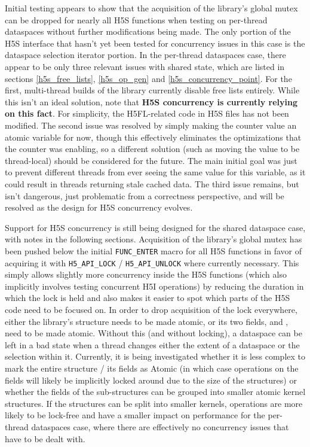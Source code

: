 \documentclass[../HDF5_RFC.tex]{subfiles}
\begin{document}
Initial testing appears to show that the acquisition of the library's global mutex can be dropped for
nearly all H5S functions when testing on per-thread dataspaces without further modifications being
made. The only portion of the H5S interface that hasn't yet been tested for concurrency issues in this
case is the dataspace selection iterator portion. In the per-thread dataspaces case, there appear to be
only three relevant issues with shared state, which are listed in sections \ref{h5s_free_lists}, \ref{h5s_op_gen} and \ref{h5s_concurrency_point}. For the first, multi-thread builds of the library
currently disable free lists entirely. While this isn't an ideal solution, note that \textbf{H5S
concurrency is currently relying on this fact}. For simplicity, the H5FL-related code in H5S files has
not been modified. The second issue was resolved by simply making the counter value an atomic variable
for now, though this effectively eliminates the optimizations that the counter was enabling, so a
different solution (such as moving the value to be thread-local) should be considered for the future.
The main initial goal was just to prevent different threads from ever seeing the same value for this
variable, as it could result in threads returning stale cached data. The third issue remains, but isn't
dangerous, just problematic from a correctness perspective, and will be resolved as the design for H5S
concurrency evolves.

Support for H5S concurrency is still being designed for the shared dataspace case, with notes in the
following sections. Acquisition of the library's global mutex has been pushed below the initial
\texttt{FUNC\_ENTER} macro for all H5S functions in favor of acquiring it with \texttt{H5\_API\_LOCK} /
\texttt{H5\_API\_UNLOCK} where currently necessary. This simply allows slightly more concurrency inside
the H5S functions (which also implicitly involves testing concurrent H5I operations) by reducing the
duration in which the lock is held and also makes it easier to spot which parts of the H5S code need to
be focused on. In order to drop acquisition of the lock everywhere, either the library's
 structure needs to be made atomic, or its two fields,  and , need to be made atomic.
Without this (and without locking), a dataspace can be left in a bad state when a thread changes either
the extent of a dataspace or the selection within it. Currently, it is being investigated whether it is
less complex to mark the entire  structure / its fields as Atomic (in which
case operations on the fields will likely be implicitly locked around due to the size of the structures) or
whether the fields of the sub-structures can be grouped into smaller atomic kernel structures. If the
structures can be split into smaller kernels, operations are more likely to be lock-free and have a smaller
impact on performance for the per-thread dataspaces case, where there are effectively no concurrency issues
that have to be dealt with.
\end{document}
